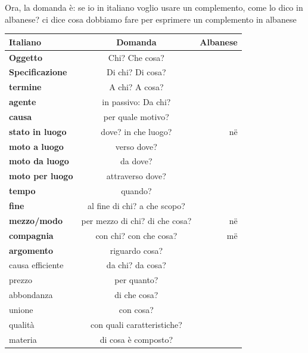 Ora, la domanda è: se io in italiano voglio usare un complemento, come lo dico in albanese?  ci dice cosa dobbiamo fare per esprimere un complemento in albanese


\begin{table}[H]
    \centering
    \begin{tabular}{lcr}
        \toprule
        Italiano            & Domanda                   & Albanese \\
        \midrule
        \textbf{Oggetto}              & Chi? Che cosa?               &\\
        \textbf{Specificazione}      & Di chi? Di cosa?              &\\
        \textbf{termine}             & A chi? A cosa?                &\\
        \textbf{agente}              & in passivo: Da chi?           &\\
        \textbf{causa}               & per quale motivo?             &\\
        \textbf{stato in luogo}      & dove? in che luogo?           & në\\
        \textbf{moto a luogo}        & verso dove?                   &\\
        \textbf{moto da luogo}       & da dove?                      &\\
        \textbf{moto per luogo}      & attraverso dove?              &\\
        \textbf{tempo}               & quando?                       &\\
        \textbf{fine}                & al fine di chi? a che scopo?  &\\
        \textbf{mezzo/modo}          & per mezzo di chi? di che cosa?& në\\
        \textbf{compagnia}           & con chi? con che cosa?        & më\\
        \textbf{argomento}           & riguardo cosa?                &\\
        causa efficiente    & da chi? da cosa?              &\\
        prezzo              & per quanto?                   &\\
        abbondanza          & di che cosa?                  &\\
        unione              & con cosa?                     &\\
        qualità             & con quali caratteristiche?    &\\
        materia             & di cosa è composto?           &\\
        

\end{tabular}
\end{table}
